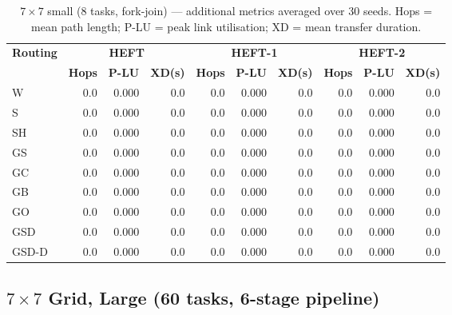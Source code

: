 \documentclass[11pt]{article}
\begin{document}
\begin{table}[H]\centering\small
\begin{tabular}{l r r r r r r r r r}
\toprule
\textbf{Routing} & \multicolumn{3}{c}{\textbf{HEFT}} & \multicolumn{3}{c}{\textbf{HEFT-1}} & \multicolumn{3}{c}{\textbf{HEFT-2}} \\
\cmidrule(lr){2-4}\cmidrule(lr){5-7}\cmidrule(lr){8-10}
& \textbf{Hops} & \textbf{P-LU} & \textbf{XD(s)} & \textbf{Hops} & \textbf{P-LU} & \textbf{XD(s)} & \textbf{Hops} & \textbf{P-LU} & \textbf{XD(s)} \\
\midrule
  W & 0.0 & 0.000 & 0.0 & 0.0 & 0.000 & 0.0 & 0.0 & 0.000 & 0.0 \\
  S & 0.0 & 0.000 & 0.0 & 0.0 & 0.000 & 0.0 & 0.0 & 0.000 & 0.0 \\
  SH & 0.0 & 0.000 & 0.0 & 0.0 & 0.000 & 0.0 & 0.0 & 0.000 & 0.0 \\
  GS & 0.0 & 0.000 & 0.0 & 0.0 & 0.000 & 0.0 & 0.0 & 0.000 & 0.0 \\
  GC & 0.0 & 0.000 & 0.0 & 0.0 & 0.000 & 0.0 & 0.0 & 0.000 & 0.0 \\
  GB & 0.0 & 0.000 & 0.0 & 0.0 & 0.000 & 0.0 & 0.0 & 0.000 & 0.0 \\
  GO & 0.0 & 0.000 & 0.0 & 0.0 & 0.000 & 0.0 & 0.0 & 0.000 & 0.0 \\
  GSD & 0.0 & 0.000 & 0.0 & 0.0 & 0.000 & 0.0 & 0.0 & 0.000 & 0.0 \\
  GSD-D & 0.0 & 0.000 & 0.0 & 0.0 & 0.000 & 0.0 & 0.0 & 0.000 & 0.0 \\
\bottomrule\end{tabular}
\caption{$7\times7$ small (8 tasks, fork-join) --- additional metrics averaged over 30 seeds. Hops = mean path length; P-LU = peak link utilisation; XD = mean transfer duration.}
\end{table}

\subsection{$7\times7$ Grid, Large (60 tasks, 6-stage pipeline)}
\end{document}
